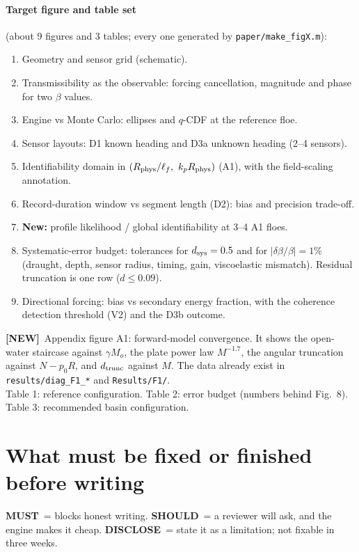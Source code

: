 \documentclass[10pt,a4paper]{article}
\newcommand{\MUST}{\textcolor{must}{\textbf{MUST}}}
\newcommand{\SHOULD}{\textcolor{should}{\textbf{SHOULD}}}
\newcommand{\DISC}{\textcolor{disc}{\textbf{DISCLOSE}}}
\newcommand{\NEW}{\textcolor{ocean}{\textbf{[NEW]}}}
\begin{document}
\paragraph{Target figure and table set} (about 9 figures and 3 tables; every one generated by \texttt{paper/make\_figX.m}):
\begin{enumerate}
\item Geometry and sensor grid (schematic).
\item Transmissibility as the observable: forcing cancellation, magnitude and phase for two $\beta$ values.
\item Engine vs Monte Carlo: ellipses and $q$-CDF at the reference floe.
\item Sensor layouts: D1 known heading and D3a unknown heading (2--4 sensors).
\item Identifiability domain in $(R_{\rm phys}/\ell_f,\ k_pR_{\rm phys})$ (A1), with the field-scaling annotation.
\item Record-duration window vs segment length (D2): bias and precision trade-off.
\item \textbf{New:} profile likelihood / global identifiability at 3--4 A1 floes.
\item Systematic-error budget: tolerances for $d_{\rm sys}=0.5$ and for $|\delta\beta/\beta|=1\%$ (draught, depth, sensor radius, timing, gain, viscoelastic mismatch). Residual truncation is one row ($d\le0.09$).
\item Directional forcing: bias vs secondary energy fraction, with the coherence detection threshold (V2) and the D3b outcome.
\end{enumerate}
\NEW\ Appendix figure A1: forward-model convergence. It shows the open-water staircase against $\gamma M_o$, the plate power law $M^{-1.7}$, the angular truncation against $N - p_0R$, and $d_{\rm trunc}$ against $M$. The data already exist in \texttt{results/diag\_F1\_*} and \texttt{Results/F1/}.\\
Table 1: reference configuration. Table 2: error budget (numbers behind Fig.~8). Table 3: recommended basin configuration.

\section{What must be fixed or finished before writing}\label{sec:fix}
\noindent\MUST\ = blocks honest writing. \SHOULD\ = a reviewer will ask, and the engine makes it cheap. \DISC\ = state it as a limitation; not fixable in three weeks.
\end{document}
